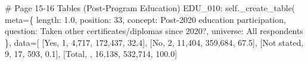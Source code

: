 \documentclass[
  11pt,
  a4paper,
]{article}
\newenvironment{Shaded}{\begin{snugshade}}{\end{snugshade}}
\newcommand{\CommentTok}[1]{\textcolor[rgb]{0.37,0.37,0.37}{#1}}
\newcommand{\NormalTok}[1]{\textcolor[rgb]{0.00,0.23,0.31}{#1}}
\newcommand{\OperatorTok}[1]{\textcolor[rgb]{0.37,0.37,0.37}{#1}}
\newcommand{\StringTok}[1]{\textcolor[rgb]{0.13,0.47,0.30}{#1}}
\newcommand{\VariableTok}[1]{\textcolor[rgb]{0.07,0.07,0.07}{#1}}
\begin{document}
\begin{Shaded}
\begin{Highlighting}[]
            \CommentTok{\# Page 15{-}16 Tables (Post{-}Program Education)}
            \StringTok{\textquotesingle{}EDU\_010\textquotesingle{}}\NormalTok{: }\VariableTok{self}\NormalTok{.\_create\_table(}
\NormalTok{                meta}\OperatorTok{=}\NormalTok{\{}
                    \StringTok{\textquotesingle{}length\textquotesingle{}}\NormalTok{: }\StringTok{\textquotesingle{}1.0\textquotesingle{}}\NormalTok{, }\StringTok{\textquotesingle{}position\textquotesingle{}}\NormalTok{: }\StringTok{\textquotesingle{}33\textquotesingle{}}\NormalTok{,}
                    \StringTok{\textquotesingle{}concept\textquotesingle{}}\NormalTok{: }\StringTok{\textquotesingle{}Post{-}2020 education participation\textquotesingle{}}\NormalTok{,}
                    \StringTok{\textquotesingle{}question\textquotesingle{}}\NormalTok{: }\StringTok{\textquotesingle{}Taken other certificates/diplomas since 2020?\textquotesingle{}}\NormalTok{,}
                    \StringTok{\textquotesingle{}universe\textquotesingle{}}\NormalTok{: }\StringTok{\textquotesingle{}All respondents\textquotesingle{}}
\NormalTok{                \},}
\NormalTok{                data}\OperatorTok{=}\NormalTok{[}
\NormalTok{                    [}\StringTok{\textquotesingle{}Yes\textquotesingle{}}\NormalTok{, }\StringTok{\textquotesingle{}1\textquotesingle{}}\NormalTok{, }\StringTok{\textquotesingle{}4,717\textquotesingle{}}\NormalTok{, }\StringTok{\textquotesingle{}172,437\textquotesingle{}}\NormalTok{, }\StringTok{\textquotesingle{}32.4\textquotesingle{}}\NormalTok{],}
\NormalTok{                    [}\StringTok{\textquotesingle{}No\textquotesingle{}}\NormalTok{, }\StringTok{\textquotesingle{}2\textquotesingle{}}\NormalTok{, }\StringTok{\textquotesingle{}11,404\textquotesingle{}}\NormalTok{, }\StringTok{\textquotesingle{}359,684\textquotesingle{}}\NormalTok{, }\StringTok{\textquotesingle{}67.5\textquotesingle{}}\NormalTok{],}
\NormalTok{                    [}\StringTok{\textquotesingle{}Not stated\textquotesingle{}}\NormalTok{, }\StringTok{\textquotesingle{}9\textquotesingle{}}\NormalTok{, }\StringTok{\textquotesingle{}17\textquotesingle{}}\NormalTok{, }\StringTok{\textquotesingle{}593\textquotesingle{}}\NormalTok{, }\StringTok{\textquotesingle{}0.1\textquotesingle{}}\NormalTok{],}
\NormalTok{                    [}\StringTok{\textquotesingle{}Total\textquotesingle{}}\NormalTok{, }\StringTok{\textquotesingle{}\textquotesingle{}}\NormalTok{, }\StringTok{\textquotesingle{}16,138\textquotesingle{}}\NormalTok{, }\StringTok{\textquotesingle{}532,714\textquotesingle{}}\NormalTok{, }\StringTok{\textquotesingle{}100.0\textquotesingle{}}\NormalTok{]}

\end{Highlighting}
\end{Shaded}
\end{document}
